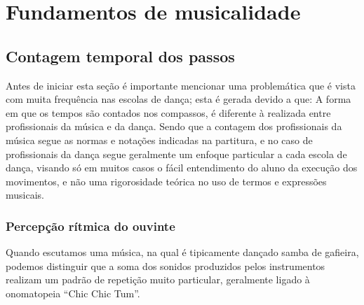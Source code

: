 
\chapter{Fundamentos de musicalidade}


\section{Contagem temporal dos passos}
Antes de iniciar esta seção é importante mencionar uma
problemática que é vista com muita frequência nas escolas de dança; 
esta é gerada devido a que: A forma em que os tempos são contados 
nos compassos, é
diferente à realizada entre profissionais da música e da dança. 
Sendo que a contagem dos profissionais da música segue as normas
e notações indicadas na partitura, e no caso de profissionais da dança segue geralmente um enfoque 
particular a cada escola de dança, visando só em muitos casos o fácil entendimento do aluno da
execução dos movimentos, e não uma rigorosidade teórica no uso de termos e 
expressões musicais.


\subsection{Percepção rítmica do ouvinte}
Quando escutamos uma música, na qual é tipicamente dançado samba de gafieira,
podemos distinguir que a soma dos sonidos produzidos pelos instrumentos realizam 
um padrão de repetição muito particular, geralmente ligado à onomatopeia ``Chic Chic Tum''.


